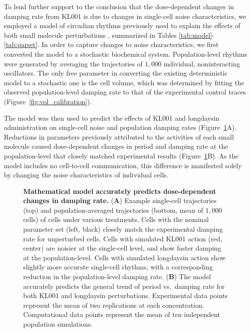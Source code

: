 \documentclass[11pt, letterpaper]{article}
\begin{document}
To lend further support to the conclusion that the dose-dependent changes in damping rate from KL001 is due to changes in single-cell noise characteristics, we employed a model of circadian rhythms previously used to explain the effects of both small molecule perturbations \cite{St.John2014}, summarized in Tables \ref{tab:model}-\ref{tab:parset}.
In order to capture changes to noise characteristics, we first converted the model to a stochastic biochemical system.
Population-level rhythms were generated by averaging the trajectories of $1,000$ individual, noninteracting oscillators.
The only free parameter in converting the existing deterministic model to a stochastic one is the cell volume, which was determined by fitting the observed population-level damping rate to that of the experimental control traces (Figure~\ref{fig:vol_calibration}).

The model was then used to predict the effects of KL001 and longdaysin administration on single-cell noise and population damping rates (Figure~\ref{fig:simulation}A).
Reductions in parameters previously attributed to the activities of each small molecule caused dose-dependent changes in period and damping rate at the population-level that closely matched experimental results (Figure~\ref{fig:simulation}B).
As the model includes no cell-to-cell communication, this difference is manifested solely by changing the noise characteristics of individual cells.

\begin{figure}[tbp]
  \begin{center}
  \end{center}
  \caption{{\bfseries Mathematical model accurately predicts dose-dependent changes in damping rate.}
({\bfseries A}) Example single-cell trajectories (top) and population-averaged trajectories (bottom, mean of $1,000$ cells) of cells under various treatments. Cells with the nominal parameter set (left, black) closely match the experimental damping rate for unperturbed cells. Cells with simulated KL001 action (red, center) are noisier at the single-cell level, and show faster damping at the population-level. Cells with simulated longdaysin action show slightly more accurate single-cell rhythms, with a corresponding reduction in the population-level damping rate.
({\bfseries B}) The model accurately predicts the general trend of period vs.\ damping rate for both KL001 and longdaysin perturbations. Experimental data points represent the mean of two replications at each concentration. Computational data points represent the mean of ten independent population simulations.}
\label{fig:simulation}
\end{figure}
\end{document}

